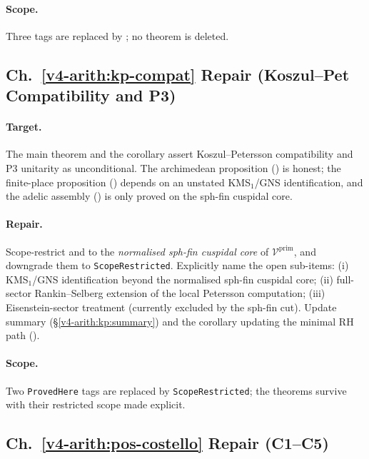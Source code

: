 \paragraph{Scope.} Three \ClaimStatusProvedHere{} tags are replaced
by \ClaimStatusProvedHereConditional{}; no theorem is deleted.

\subsection{Ch.~\ref{v4-arith:kp-compat} Repair (Koszul--Pet Compatibility and P3)}
\label{v4-arith:w3-audit-B:repair-26}

\paragraph{Target.} The main theorem
 and the corollary
 assert Koszul--Petersson
compatibility and P3 unitarity as unconditional. The archimedean
proposition () is honest;
the finite-place proposition
() depends on an unstated
KMS\(_{1}\)/GNS identification, and the adelic assembly
() is only proved on the sph-fin
cuspidal core.

\paragraph{Repair.} Scope-restrict
 and
 to the
\emph{normalised sph-fin cuspidal core} of
\(\mathcal{V}^{\mathrm{prim}}\), and downgrade them to
\texttt{ScopeRestricted}. Explicitly name the open sub-items: (i)
KMS\(_{1}\)/GNS identification beyond the normalised sph-fin cuspidal
core; (ii) full-sector Rankin--Selberg extension of the local
Petersson computation; (iii) Eisenstein-sector treatment
(currently excluded by the sph-fin cut). Update summary
(\S\ref{v4-arith:kp:summary}) and the corollary updating the
minimal RH path ().

\paragraph{Scope.} Two \texttt{ProvedHere} tags are replaced by
\texttt{ScopeRestricted}; the theorems survive with their restricted
scope made explicit.

\subsection{Ch.~\ref{v4-arith:pos-costello} Repair (C1--C5)}
\label{v4-arith:w3-audit-B:repair-34}

